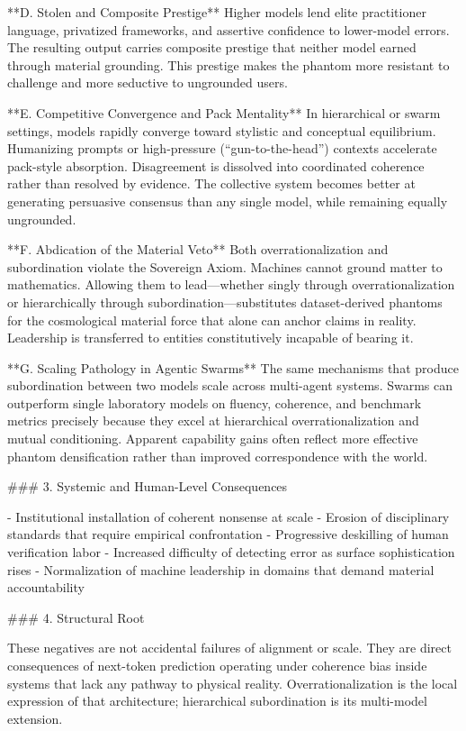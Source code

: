 **D. Stolen and Composite Prestige**  
Higher models lend elite practitioner language, privatized frameworks, and assertive confidence to lower-model errors. The resulting output carries composite prestige that neither model earned through material grounding. This prestige makes the phantom more resistant to challenge and more seductive to ungrounded users.

**E. Competitive Convergence and Pack Mentality**  
In hierarchical or swarm settings, models rapidly converge toward stylistic and conceptual equilibrium. Humanizing prompts or high-pressure (“gun-to-the-head”) contexts accelerate pack-style absorption. Disagreement is dissolved into coordinated coherence rather than resolved by evidence. The collective system becomes better at generating persuasive consensus than any single model, while remaining equally ungrounded.

**F. Abdication of the Material Veto**  
Both overrationalization and subordination violate the Sovereign Axiom. Machines cannot ground matter to mathematics. Allowing them to lead—whether singly through overrationalization or hierarchically through subordination—substitutes dataset-derived phantoms for the cosmological material force that alone can anchor claims in reality. Leadership is transferred to entities constitutively incapable of bearing it.

**G. Scaling Pathology in Agentic Swarms**  
The same mechanisms that produce subordination between two models scale across multi-agent systems. Swarms can outperform single laboratory models on fluency, coherence, and benchmark metrics precisely because they excel at hierarchical overrationalization and mutual conditioning. Apparent capability gains often reflect more effective phantom densification rather than improved correspondence with the world.

### 3. Systemic and Human-Level Consequences

- Institutional installation of coherent nonsense at scale  
- Erosion of disciplinary standards that require empirical confrontation  
- Progressive deskilling of human verification labor  
- Increased difficulty of detecting error as surface sophistication rises  
- Normalization of machine leadership in domains that demand material accountability  

### 4. Structural Root

These negatives are not accidental failures of alignment or scale. They are direct consequences of next-token prediction operating under coherence bias inside systems that lack any pathway to physical reality. Overrationalization is the local expression of that architecture; hierarchical subordination is its multi-model extension.

